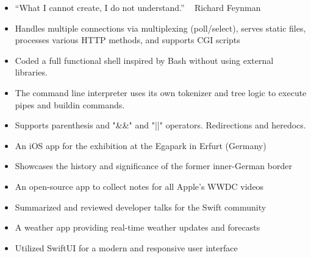 \documentclass[10pt,a4paper,withhyper]{altacv}
\begin{document}
\begin{paracol}{2}
\divider

\begin{itemize}
  \item “What I cannot create, I do not understand.” ~ Richard Feynman
  \item Handles multiple connections via multiplexing (poll/select), serves static files, processes various HTTP methods, and supports CGI scripts
\end{itemize}

\divider


\begin{itemize}
  \item Coded a full functional shell inspired by Bash without using external libraries.
  \item The command line interpreter uses its own tokenizer and tree logic to execute pipes and buildin commands.
  \item Supports parenthesis and "\&\&" and "||" operators. Redirections and heredocs.
\end{itemize}

\divider

\begin{itemize}
  \item An iOS app for the exhibition at the Egapark in Erfurt (Germany)
  \item Showcases the history and significance of the former inner-German border
\end{itemize}

\divider

\begin{itemize}
  \item An open-source app to collect notes for all Apple's WWDC videos
  \item Summarized and reviewed developer talks for the Swift community
\end{itemize}
\divider

\begin{itemize}
  \item A weather app providing real-time weather updates and forecasts
  \item Utilized SwiftUI for a modern and responsive user interface
\end{itemize}
\divider



\end{paracol}
\end{document}
